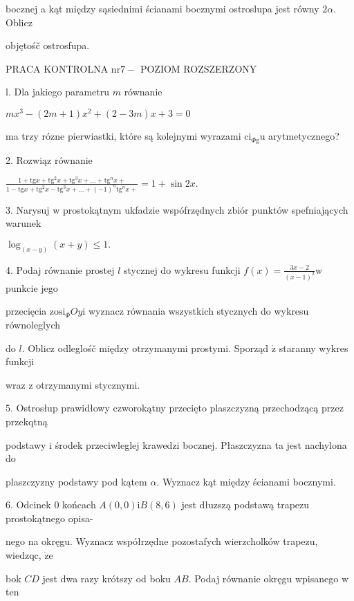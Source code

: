 \documentclass[a4paper,12pt]{article}
\begin{document}
bocznej a kąt między sąsiednimi ścianami bocznymi ostroslupa jest równy $ 2\alpha$. Oblicz

objętośč ostrosfupa.




PRACA KONTROLNA $\mathrm{n}\mathrm{r} 7-$ POZIOM ROZSZERZONY

l. Dla jakiego parametru $m$ równanie

$mx^{3}-(2m+1)x^{2}+(2-3m)x+3=0$

ma trzy rózne pierwiastki, które są kolejnymi wyrazami $\mathrm{c}\mathrm{i}_{\Phi \mathrm{g}}\mathrm{u}$ arytmetycznego?

2. Rozwiąz równanie

$\displaystyle \frac{1+\mathrm{t}\mathrm{g}x+\mathrm{t}\mathrm{g}^{2}x+\mathrm{t}\mathrm{g}^{3}x+\ldots+\mathrm{t}\mathrm{g}^{n}x+}{1-\mathrm{t}\mathrm{g}x+\mathrm{t}\mathrm{g}^{2}x-\mathrm{t}\mathrm{g}^{3}x+\ldots+(-1)^{n}\mathrm{t}\mathrm{g}^{n}x+}=1+\sin 2x.$

3. Narysuj $\mathrm{w}$ prostokątnym ukfadzie wspófrzędnych zbiór punktów spefniających warunek

$\log_{(x-y)}(x+y)\leq 1.$

4. Podaj równanie prostej $l$ stycznej do wykresu funkcji $f(x)=\displaystyle \frac{3x-2}{(x-1)^{2}} \mathrm{w}$ punkcie jego

przecięcia $\mathrm{z}\mathrm{o}\mathrm{s}\mathrm{i}_{\Phi}Oy\mathrm{i}$ wyznacz równania wszystkich stycznych do wykresu równoleglych

do $l$. Oblicz odleglośč między otrzymanymi prostymi. Sporząd $\acute{\mathrm{z}}$ staranny wykres funkcji

wraz $\mathrm{z}$ otrzymanymi stycznymi.

5. Ostrosłup prawidłowy czworokątny przecięto plaszczyzną przechodzącą przez przekqtną

podstawy $\mathrm{i}$ środek przeciwleglej krawedzi bocznej. Płaszczyzna ta jest nachylona do

plaszczyzny podstawy pod kątem $\alpha$. Wyznacz kąt między ścianami bocznymi.

6. Odcinek $0$ końcach $A(0,0)\mathrm{i}B(8,6)$ jest dłuzszą podstawą trapezu prostokątnego opisa-

nego na okręgu. Wyznacz współrzędne pozostafych wierzcholków trapezu, wiedzqc, $\dot{\mathrm{z}}\mathrm{e}$

bok $CD$ jest dwa razy krótszy od boku $AB$. Podaj równanie okręgu wpisanego $\mathrm{w}$ ten
\end{document}
